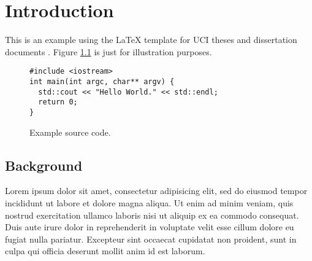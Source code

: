 \chapter{Introduction}

This is an example using the \LaTeX{} template for UCI theses and
dissertation documents \cite{uci-thesis-latex}. Figure
\ref{fig:sourcecode} is just for illustration purposes.

\begin{figure}
\begin{verbatim}
#include <iostream>
int main(int argc, char** argv) {
  std::cout << "Hello World." << std::endl;
  return 0;
}
\end{verbatim}
\caption{Example source code.}
\label{fig:sourcecode}
\end{figure}

\section{Background}

Lorem ipsum dolor sit amet, consectetur adipisicing elit, sed do
eiusmod tempor incididunt ut labore et dolore magna aliqua. Ut enim ad
minim veniam, quis nostrud exercitation ullamco laboris nisi ut
aliquip ex ea commodo consequat. Duis aute irure dolor in
reprehenderit in voluptate velit esse cillum dolore eu fugiat nulla
pariatur. Excepteur sint occaecat cupidatat non proident, sunt in
culpa qui officia deserunt mollit anim id est laborum.



